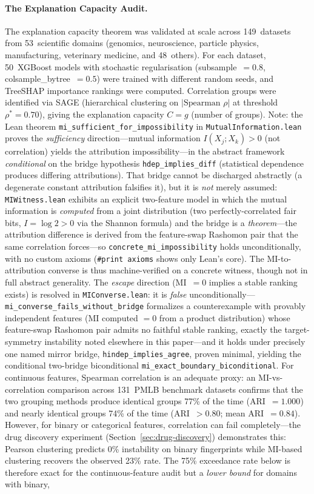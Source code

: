 \documentclass[11pt,a4paper]{article}
\begin{document}
\paragraph{The Explanation Capacity Audit.}
The explanation capacity theorem was validated at scale across 149~datasets from 53~scientific domains (genomics, neuroscience, particle physics, manufacturing, veterinary medicine, and 48~others).  For each dataset, 50~XGBoost models with stochastic regularisation (subsample~$= 0.8$, colsample\_bytree~$= 0.5$) were trained with different random seeds, and TreeSHAP importance rankings were computed.  Correlation groups were identified via SAGE (hierarchical clustering on $|\text{Spearman } \rho|$ at threshold $\rho^* = 0.70$), giving the explanation capacity $C = g$ (number of groups).  Note: the Lean theorem \texttt{mi\_sufficient\_for\_impossibility} in \texttt{MutualInformation.lean} proves the \emph{sufficiency} direction---mutual information $I(X_j; X_k) > 0$ (not correlation) yields the attribution impossibility---in the abstract framework \emph{conditional} on the bridge hypothesis \texttt{hdep\_implies\_diff} (statistical dependence produces differing attributions). That bridge cannot be discharged abstractly (a degenerate constant attribution falsifies it), but it is \emph{not} merely assumed: \texttt{MIWitness.lean} exhibits an explicit two-feature model in which the mutual information is \emph{computed} from a joint distribution (two perfectly-correlated fair bits, $I = \log 2 > 0$ via the Shannon formula) and the bridge is a \emph{theorem}---the attribution difference is derived from the feature-swap Rashomon pair that the same correlation forces---so \texttt{concrete\_mi\_impossibility} holds unconditionally, with no custom axioms (\texttt{\#print axioms} shows only Lean's core). The MI-to-attribution converse is thus machine-verified on a concrete witness, though not in full abstract generality.  The \emph{escape} direction (MI~$= 0$ implies a stable ranking exists) is resolved in \texttt{MIConverse.lean}: it is \emph{false} unconditionally---\texttt{mi\_converse\_fails\_without\_bridge} formalizes a counterexample with provably independent features (MI computed $= 0$ from a product distribution) whose feature-swap Rashomon pair admits no faithful stable ranking, exactly the target-symmetry instability noted elsewhere in this paper---and it holds under precisely one named mirror bridge, \texttt{hindep\_implies\_agree}, proven minimal, yielding the conditional two-bridge biconditional \texttt{mi\_exact\_boundary\_biconditional}.  For continuous features, Spearman correlation is an adequate proxy: an MI-vs-correlation comparison across 131~PMLB benchmark datasets confirms that the two grouping methods produce identical groups 77\% of the time (ARI~$= 1.000$) and nearly identical groups 74\% of the time (ARI~$> 0.80$; mean ARI~$= 0.84$).  However, for binary or categorical features, correlation can fail completely---the drug discovery experiment (Section~\ref{sec:drug-discovery}) demonstrates this: Pearson clustering predicts 0\% instability on binary fingerprints while MI-based clustering recovers the observed 23\% rate.  The 75\% exceedance rate below is therefore exact for the continuous-feature audit but a \emph{lower bound} for domains with binary, 
\end{document}

